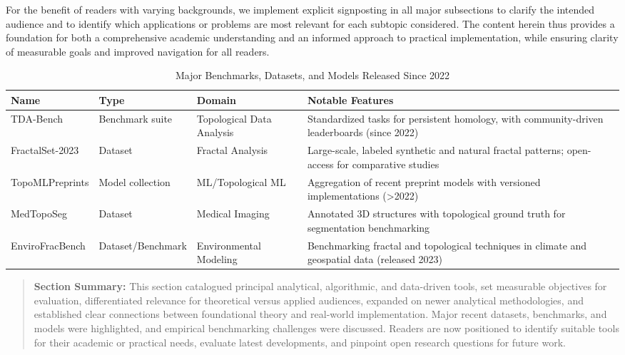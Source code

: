 \documentclass[sigconf]{acmart}
\begin{document}
For the benefit of readers with varying backgrounds, we implement explicit signposting in all major subsections to clarify the intended audience and to identify which applications or problems are most relevant for each subtopic considered. The content herein thus provides a foundation for both a comprehensive academic understanding and an informed approach to practical implementation, while ensuring clarity of measurable goals and improved navigation for all readers.

\begin{table*}[htbp]
\centering
\caption{Major Benchmarks, Datasets, and Models Released Since 2022}
\label{tab:recent_benchmarks}
\begin{adjustbox}{max width=\textwidth}
\begin{tabular}{@{}llll@{}}
\toprule
Name & Type & Domain & Notable Features \\
\midrule
TDA-Bench & Benchmark suite & Topological Data Analysis & Standardized tasks for persistent homology, with community-driven leaderboards (since 2022) \\
FractalSet-2023 & Dataset & Fractal Analysis & Large-scale, labeled synthetic and natural fractal patterns; open-access for comparative studies \\
TopoMLPreprints & Model collection & ML/Topological ML & Aggregation of recent preprint models with versioned implementations (\textgreater2022) \\
MedTopoSeg & Dataset & Medical Imaging & Annotated 3D structures with topological ground truth for segmentation benchmarking \\
EnviroFracBench & Dataset/Benchmark & Environmental Modeling & Benchmarking fractal and topological techniques in climate and geospatial data (released 2023) \\
\bottomrule
\end{tabular}
\end{adjustbox}
\end{table*}

\begin{quote}
\textbf{Section Summary:} This section catalogued principal analytical, algorithmic, and data-driven tools, set measurable objectives for evaluation, differentiated relevance for theoretical versus applied audiences, expanded on newer analytical methodologies, and established clear connections between foundational theory and real-world implementation. Major recent datasets, benchmarks, and models were highlighted, and empirical benchmarking challenges were discussed. Readers are now positioned to identify suitable tools for their academic or practical needs, evaluate latest developments, and pinpoint open research questions for future work.
\end{quote}
\end{document}
